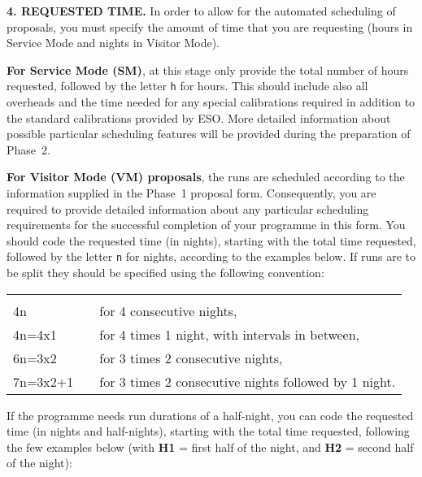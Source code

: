 \documentclass{article}
\begin{document}
\medskip

{\bf 4.  REQUESTED TIME.}  In order to allow for the automated
scheduling of proposals, you must specify the amount of time 
that you are requesting (hours in Service Mode and nights in Visitor
Mode). 

\smallskip

{\bf For Service Mode (SM)}, at this stage only provide the total
number of hours requested, followed by the letter \verb|h| for hours.
This should include also all overheads and the time needed for any special calibrations
required in addition to the standard calibrations provided by ESO.
More detailed information about possible particular scheduling
features will be provided during the preparation of Phase~2.

\smallskip

{\bf For Visitor Mode (VM) proposals}, the runs are scheduled
according to the information supplied in the Phase~1 proposal
form.  Consequently, you are required to provide detailed information 
about any particular scheduling requirements for the successful 
completion of your programme in this form.  You
should code the requested time (in nights), starting with the total
time requested, followed by the letter \verb|n| for nights, according
to the examples below.
If runs are to be split they should be specified using the following
convention:

\begin{tabular}{ll}
& \\
4n          & for 4 consecutive nights, \\
4n=4x1      & for 4 times 1 night, with intervals in between,\\
6n=3x2      & for 3 times 2 consecutive nights, \\
7n=3x2+1 \,\,\,\, & for 3 times 2 consecutive nights followed by 1 night. \\
\end{tabular}

\bigskip

If the programme needs run durations of a half-night, you can code the
requested time (in nights and half-nights), starting with the total
time requested, following the few examples below (with {\bf H1} =
first half of the night, and {\bf H2} = second half of the night):
\end{document}
